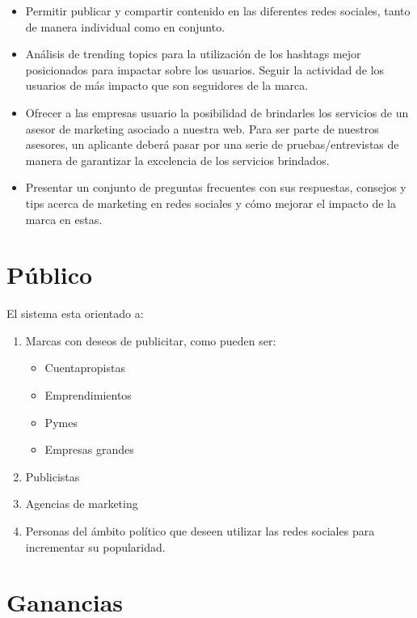 \documentclass[oneside]{book}
\begin{document}
\begin{itemize}
\item Permitir publicar y compartir contenido en las diferentes redes sociales, tanto de manera individual como en conjunto. 

\item Análisis de trending topics para la utilización de los hashtags mejor posicionados para impactar sobre los usuarios.
Seguir la actividad de los usuarios de más impacto que son seguidores de la marca. 

\item Ofrecer a las empresas usuario la posibilidad de brindarles los servicios de un asesor de marketing asociado a nuestra web. Para ser parte de nuestros asesores, un aplicante deber\'{a} pasar por una serie de pruebas/entrevistas de manera de garantizar la excelencia de los servicios brindados. 

\item Presentar un conjunto de preguntas frecuentes con sus respuestas, consejos y tips acerca de marketing en redes sociales y cómo mejorar el impacto de la marca en estas.


\end{itemize}


\section{P\'{u}blico}


El sistema esta orientado a:

\begin{enumerate}
	\item Marcas con deseos de publicitar, como pueden ser:
	\begin{itemize}
		\item Cuentapropistas
		\item Emprendimientos 
		\item Pymes
		\item Empresas grandes
	\end{itemize}
	\item Publicistas
	\item Agencias de marketing
	\item Personas del \'{a}mbito pol\'{i}tico que deseen utilizar las redes sociales para incrementar su popularidad. 
\end{enumerate}
 


\section{Ganancias}
\end{document}
